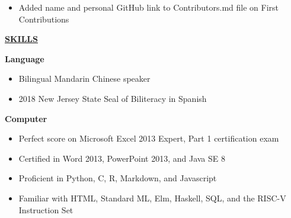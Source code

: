 \documentclass[
]{article}
\providecommand{\tightlist}{%
  \setlength{\itemsep}{0pt}\setlength{\parskip}{0pt}}
\begin{document}
\begin{itemize}
\tightlist
\item
  Added name and personal GitHub link to Contributors.md file on First
  Contributions
\end{itemize}

\textbf{\underline{SKILLS}}

\textbf{Language}

\begin{itemize}
\item
  Bilingual Mandarin Chinese speaker 
\item
  2018 New Jersey State Seal of Biliteracy in Spanish
\end{itemize}

\textbf{Computer}

\begin{itemize}
\item
  Perfect score on Microsoft Excel 2013 Expert, Part 1 certification
  exam
\item
  Certified in Word 2013, PowerPoint 2013, and Java SE 8
\end{itemize}

\begin{itemize}
\item
  Proficient in Python, C, R, Markdown, and Javascript
\item
  Familiar with HTML, Standard ML, Elm, Haskell, SQL, and the RISC-V
  Instruction Set
\end{itemize}
\end{document}
